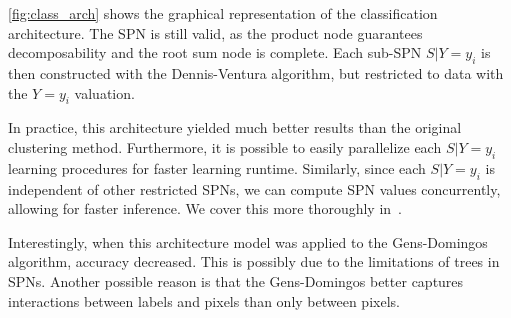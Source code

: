 \autoref{fig:class_arch} shows the graphical representation of the classification architecture. The
SPN is still valid, as the product node guarantees decomposability and the root sum node is
complete. Each sub-SPN $S|Y=y_i$ is then constructed with the Dennis-Ventura algorithm, but
restricted to data with the $Y=y_i$ valuation.

In practice, this architecture yielded much better results than the original clustering method.
Furthermore, it is possible to easily parallelize each $S|Y=y_i$ learning procedures for faster
learning runtime. Similarly, since each $S|Y=y_i$ is independent of other restricted SPNs, we can
compute SPN values concurrently, allowing for faster inference. We cover this more thoroughly
in~.

Interestingly, when this architecture model was applied to the Gens-Domingos algorithm, accuracy
decreased. This is possibly due to the limitations of trees in SPNs. Another possible reason is
that the Gens-Domingos better captures interactions between labels and pixels than only between
pixels.

